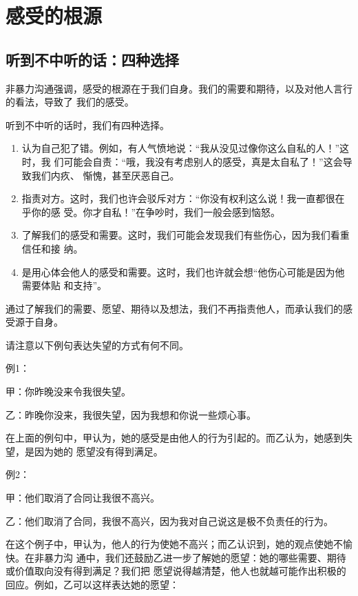 \documentclass{ctexart}
\renewenvironment{quotation}{\setlength{\parskip}{0.5em}\setstretch{1.5}\kaishu\zihao{-5}\setlength{\parindent}{1em}}{\vspace{1em}}
\begin{document}
\section{感受的根源}\label{sec:感受的根源}


\subsection{听到不中听的话：四种选择}

非暴力沟通强调，感受的根源在于我们自身。我们的需要和期待，以及对他人言行的看法，导致了
我们的感受。

听到不中听的话时，我们有四种选择。

\begin{enumerate}[label=第\chinese*种]
	\item 认为自己犯了错。例如，有人气愤地说：``我从没见过像你这么自私的人！''这时，我
	      们可能会自责：``哦，我没有考虑别人的感受，真是太自私了！''这会导致我们内疚、
	      惭愧，甚至厌恶自己。
	\item 指责对方。这时，我们也许会驳斥对方：``你没有权利这么说！我一直都很在乎你的感
	      受。你才自私！''在争吵时，我们一般会感到恼怒。
	\item 了解我们的感受和需要。这时，我们可能会发现我们有些伤心，因为我们看重信任和接
	      纳。
	\item 是用心体会他人的感受和需要。这时，我们也许就会想``他伤心可能是因为他需要体贴
	      和支持''。
\end{enumerate}

通过了解我们的需要、愿望、期待以及想法，我们不再指责他人，而承认我们的感受源于自身。

请注意以下例句表达失望的方式有何不同。

例1：

\begin{quotation}
	甲：你昨晚没来令我很失望。

	乙：昨晚你没来，我很失望，因为我想和你说一些烦心事。
\end{quotation}

在上面的例句中，甲认为，她的感受是由他人的行为引起的。而乙认为，她感到失望，是因为她的
愿望没有得到满足。

例2：

\begin{quotation}
	甲：他们取消了合同让我很不高兴。

	乙：他们取消了合同，我很不高兴，因为我对自己说这是极不负责任的行为。
\end{quotation}

在这个例子中，甲认为，他人的行为使她不高兴；而乙认识到，她的观点使她不愉快。在非暴力沟
通中，我们还鼓励乙进一步了解她的愿望：她的哪些需要、期待或价值取向没有得到满足？我们把
愿望说得越清楚，他人也就越可能作出积极的回应。例如，乙可以这样表达她的愿望：
\end{document}
